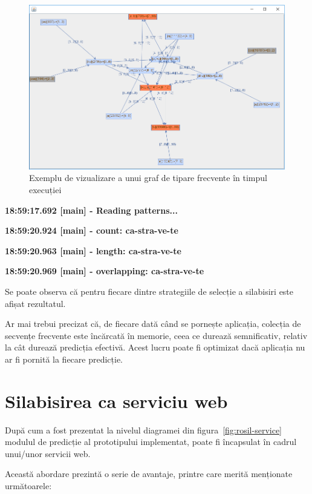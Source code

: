 \begin{figure}[h!]
    \centering
    \includegraphics[width=1.0\textwidth]{figures/rosil-castravete.png}
    \caption{Exemplu de vizualizare a unui graf de tipare frecvente în timpul execuției}
    \label{fig:rosil-graph}
\end{figure}


\textbf{18:59:17.692 [main] - Reading patterns...}

\textbf{18:59:20.924 [main] - count: ca-stra-ve-te}

\textbf{18:59:20.963 [main] - length: ca-stra-ve-te}

\textbf{18:59:20.969 [main] - overlapping: ca-stra-ve-te}

Se poate observa că pentru fiecare dintre strategiile de selecție a silabisiri este afișat rezultatul. 

Ar mai trebui precizat că, de fiecare dată când se pornește aplicația, colecția de secvențe frecvente este încărcată în memorie, ceea ce durează semnificativ, relativ la cât durează predicția efectivă. Acest lucru poate fi optimizat dacă aplicația nu ar fi pornită la fiecare predicție.

\section{Silabisirea ca serviciu web}

După cum a fost prezentat la nivelul diagramei din figura~\ref{fig:rosil-service} modulul de predicție al prototipului implementat, poate fi încapsulat în cadrul unui/unor servicii web.

Această abordare prezintă o serie de avantaje, printre care merită menționate următoarele:

